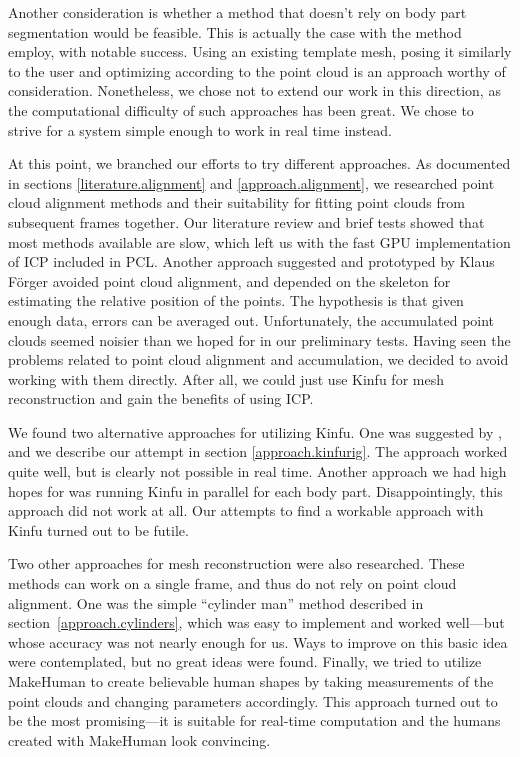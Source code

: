 Another consideration is whether a method that doesn't rely on body part segmentation would be feasible. This is actually the case with the method \citet{weiss2011home} employ, with notable success. Using an existing template mesh, posing it similarly to the user and optimizing according to the point cloud is an approach worthy of consideration. Nonetheless, we chose not to extend our work in this direction, as the computational difficulty of such approaches has been great. We chose to strive for a system simple enough to work in real time instead.

At this point, we branched our efforts to try different approaches. As documented in sections \ref{literature.alignment} and \ref{approach.alignment}, we researched point cloud alignment methods and their suitability for fitting point clouds from subsequent frames together. Our literature review and brief tests showed that most methods available are slow, which left us with the fast GPU implementation of ICP included in PCL. Another approach suggested and prototyped by Klaus Förger avoided point cloud alignment, and depended on the skeleton for estimating the relative position of the points. The hypothesis is that given enough data, errors can be averaged out. Unfortunately, the accumulated point clouds seemed noisier than we hoped for in our preliminary tests. Having seen the problems related to point cloud alignment and accumulation, we decided to avoid working with them directly. After all, we could just use Kinfu for mesh reconstruction and gain the benefits of using ICP.

We found two alternative approaches for utilizing Kinfu. One was suggested by \citet{charpentier2011accurate}, and we describe our attempt in section \ref{approach.kinfurig}. The approach worked quite well, but is clearly not possible in real time. Another approach we had high hopes for was running Kinfu in parallel for each body part. Disappointingly, this approach did not work at all. Our attempts to find a workable approach with Kinfu turned out to be futile.

Two other approaches for mesh reconstruction were also researched. These methods can work on a single frame, and thus do not rely on point cloud alignment. One was the simple ``cylinder man'' method described in section~\ref{approach.cylinders}, which was easy to implement and worked well---but whose accuracy was not nearly enough for us. Ways to improve on this basic idea were contemplated, but no great ideas were found. Finally, we tried to utilize MakeHuman to create believable human shapes by taking measurements of the point clouds and changing parameters accordingly. This approach turned out to be the most promising---it is suitable for real-time computation and the humans created with MakeHuman look convincing.

